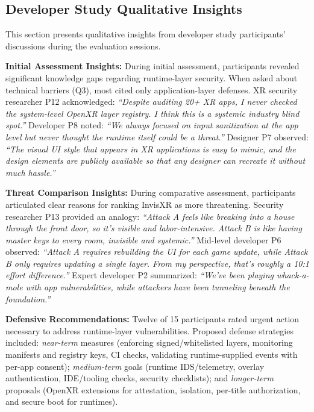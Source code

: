 \documentclass[letterpaper,twocolumn,10pt]{article}
\begin{document}
\subsection{Developer Study Qualitative Insights}
\label{sec:developerstudy}

This section presents qualitative insights from developer study participants' discussions during the evaluation sessions.

\textbf{Initial Assessment Insights:} During initial assessment, participants revealed significant knowledge gaps regarding runtime-layer security. When asked about technical barriers (Q3), most cited only application-layer defenses. XR security researcher P12 acknowledged: \textit{``Despite auditing 20+ XR apps, I never checked the system-level OpenXR layer registry. I think this is a systemic industry blind spot.''} Developer P8 noted: \textit{``We always focused on input sanitization at the app level but never thought the runtime itself could be a threat.''} Designer P7 observed: \textit{``The visual UI style that appears in XR applications is easy to mimic, and the design elements are publicly available so that any designer can recreate it without much hassle.''}

\textbf{Threat Comparison Insights:} During comparative assessment, participants articulated clear reasons for ranking InvisXR as more threatening. Security researcher P13 provided an analogy: \textit{``Attack A feels like breaking into a house through the front door, so it's visible and labor-intensive. Attack B is like having master keys to every room, invisible and systemic.''} Mid-level developer P6 observed: \textit{``Attack A requires rebuilding the UI for each game update, while Attack B only requires updating a single layer. From my perspective, that's roughly a 10:1 effort difference.''} Expert developer P2 summarized: \textit{``We've been playing whack-a-mole with app vulnerabilities, while attackers have been tunneling beneath the foundation.''}

\textbf{Defensive Recommendations:} Twelve of 15 participants rated urgent action necessary to address runtime-layer vulnerabilities. Proposed defense strategies included: \emph{near-term} measures (enforcing signed/whitelisted layers, monitoring manifests and registry keys, CI checks, validating runtime-supplied events with per-app consent); \emph{medium-term} goals (runtime IDS/telemetry, overlay authentication, IDE/tooling checks, security checklists); and \emph{longer-term} proposals (OpenXR extensions for attestation, isolation, per-title authorization, and secure boot for runtimes).
\end{document}
